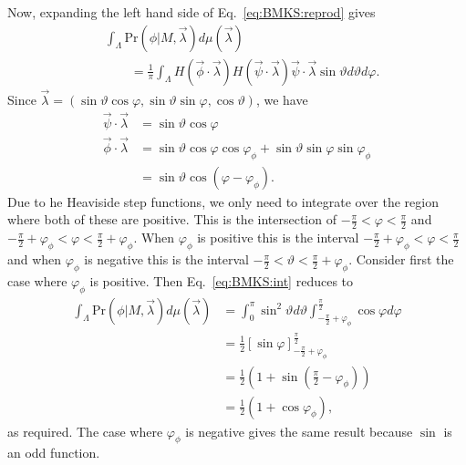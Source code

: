 \documentclass[DIV=calc,paper=a4,fontsize=11pt,twocolumn]{scrartcl} %
\theoremstyle{definition}
\theoremstyle{plain}
\begin{document}
Now, expanding the left hand side of Eq.~\eqref{eq:BMKS:reprod} gives
\begin{align}
\label{eq:BMKS:int}
&\int_{\Lambda} \text{Pr}(\phi|M,\vec{\lambda}) d\mu(\vec{\lambda}) \nonumber\\
&\quad\quad=
\frac{1}{\pi} \int_{\Lambda}  H (\vec{\phi} \cdot \vec{\lambda})
H \left ( \vec{\psi} \cdot \vec{\lambda} \right )
\vec{\psi} \cdot \vec{\lambda} \sin \vartheta d\vartheta d\varphi.
\end{align}
Since $\vec{\lambda} = (\sin \vartheta \cos \varphi, \sin \vartheta \sin
\varphi, \cos \vartheta)$, we have
\begin{align}
\vec{\psi} \cdot \vec{\lambda} & = \sin \vartheta \cos \varphi \\
\vec{\phi} \cdot \vec{\lambda} & = \sin \vartheta \cos \varphi \cos
\varphi_{\phi} + \sin \vartheta \sin \varphi \sin \varphi_{\phi} \\
& = \sin \vartheta \cos \left ( \varphi - \varphi_{\phi} \right ).
\end{align}
Due to he Heaviside step functions, we only need to integrate over the
region where both of these are positive.  This is the intersection of
$-\frac{\pi}{2} < \varphi < \frac{\pi}{2}$ and $-\frac{\pi}{2} +
\varphi_{\phi} < \varphi < \frac{\pi}{2} + \varphi_{\phi}$.  When
$\varphi_{\phi}$ is positive this is the interval $-\frac{\pi}{2} +
\varphi_{\phi} < \varphi < \frac{\pi}{2}$ and when $\varphi_{\phi}$ is
negative this is the interval $-\frac{\pi}{2} < \vartheta <
\frac{\pi}{2} + \varphi_{\phi}$.  Consider first the case where
$\varphi_{\phi}$ is positive.  Then Eq.~\eqref{eq:BMKS:int} reduces to
\begin{align}
\int_{\Lambda} \text{Pr}(\phi|M,\vec{\lambda}) d\mu(\vec{\lambda}) &
= \int_0^{\pi} \sin^2 \vartheta d \vartheta \int_{-\frac{\pi}{2} +
\varphi_{\phi}}^{\frac{\pi}{2}} \cos \varphi d \varphi  \\
& = \frac{1}{2} \left [ \sin \varphi \right ]_{-\frac{\pi}{2} +
\varphi_{\phi}}^{\frac{\pi}{2}} \\
& = \frac{1}{2} \left ( 1 + \sin \left ( \frac{\pi}{2} -
\varphi_{\phi}\right )\right ) \\
& = \frac{1}{2} \left ( 1 + \cos \varphi_{\phi} \right ),
\end{align}
as required.  The case where $\varphi_{\phi}$ is negative gives the
same result because $\sin$ is an odd function.
\end{document}
